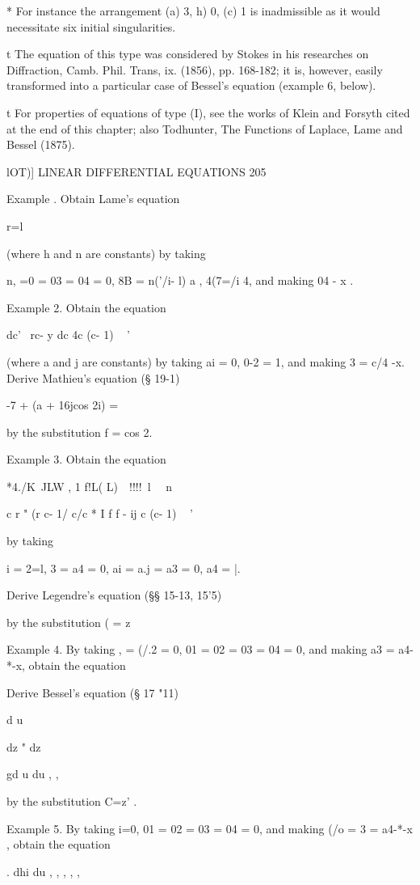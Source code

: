 * For instance the arrangement (a) 3, h) 0, (c) 1 is inadmissible as
it would necessitate six initial singularities.

t The equation of this type was considered by Stokes in his researches
on Diffraction, Camb. Phil. Trans, ix. (1856), pp. 168-182; it is,
however, easily transformed into a particular case of Bessel's
equation (example 6, below).

t For properties of equations of type (I), see the works of Klein and
Forsyth cited at the end of this chapter; also Todhunter, The
Functions of Laplace, Lame and Bessel (1875).

lOT)] LINEAR DIFFERENTIAL EQUATIONS 205

Example . Obtain Lame's equation

r=l

(where h and n are constants) by taking

n, =0 = 03 = 04 = 0, 8B = n('/i- l) a , 4(7=/i 4, and making 04 - x .

Example 2. Obtain the equation

dc' \ rc- y dc 4c (c- 1) ~ '

(where a and j are constants) by taking ai = 0, 0-2 = 1, and making 3
= c/4 -x. Derive Mathieu's equation (§ 19-1)

-7 + (a + 16jcos 2i) =

by the substitution f = cos 2.

Example 3. Obtain the equation

 *4./K\ JLW , 1 f!L( L)\ \ !!!!\ l \ \ n

c r " (r c- 1/ c/c * I f f - ij c (c- 1) ~ '

by taking

 i = 2=l, 3 = a4 = 0, ai = a.j = a3 = 0, a4 = |.

Derive Legendre's equation (§§ 15-13, 15'5)

by the substitution ( = z~\

Example 4. By taking , = (/.2 = 0, 01 = 02 = 03 = 04 = 0, and making
a3 = a4-*-x, obtain the equation

Derive Bessel's equation (§ 17 "11)

d u

dz " dz

gd u du , ,

by the substitution C=z' .

Example 5. By taking i=0, 01 = 02 = 03 = 04 = 0, and making (/o = 3 =
a4-*-x , obtain the equation

. dhi du , , , , ,

